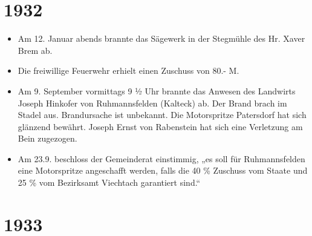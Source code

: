\documentclass[12pt,a4paper]{book}
\begin{document}
\section*{1932}

\begin{itemize}
\item Am 12. Januar abends brannte das Sägewerk in der Stegmühle des Hr.
Xaver Brem ab.

\item Die freiwillige Feuerwehr erhielt einen Zuschuss von 80.- M.

\item Am 9. September vormittags 9 ½ Uhr brannte das Anwesen des
Landwirts Joseph Hinkofer von Ruhmannsfelden (Kalteck) ab. Der Brand
brach im Stadel aus. Brandursache ist unbekannt. Die Motorspritze
Patersdorf hat sich glänzend bewährt. Joseph Ernst von Rabenstein hat
sich eine Verletzung am Bein zugezogen.

\item Am 23.9. beschloss der Gemeinderat einstimmig, „es soll für
Ruhmannsfelden eine Motorspritze angeschafft werden, falls die 40 \%
Zuschuss vom Staate und 25 \% vom Bezirksamt Viechtach garantiert sind.“
\end{itemize}

\section*{1933}
\end{document}
